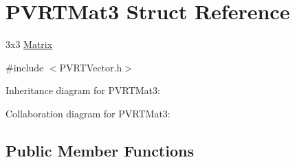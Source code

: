 \hypertarget{struct_p_v_r_t_mat3}{\section{P\+V\+R\+T\+Mat3 Struct Reference}
\label{struct_p_v_r_t_mat3}
}


3x3 \hyperlink{class_matrix}{Matrix}  




{\ttfamily \#include $<$P\+V\+R\+T\+Vector.\+h$>$}



Inheritance diagram for P\+V\+R\+T\+Mat3\+:


Collaboration diagram for P\+V\+R\+T\+Mat3\+:
\subsection*{Public Member Functions}
